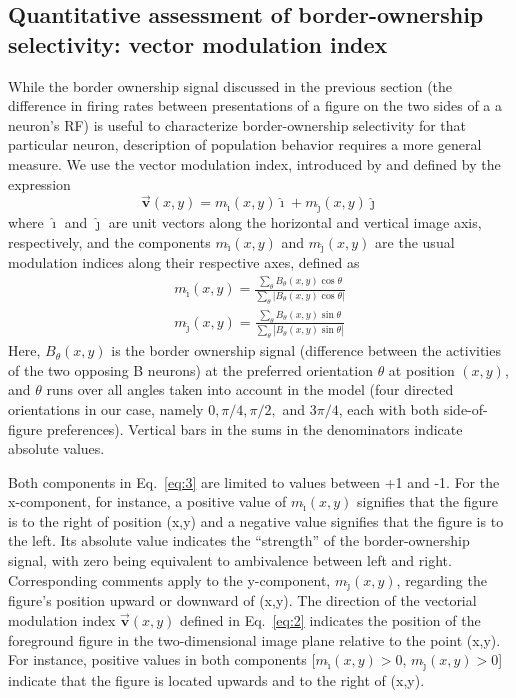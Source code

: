 \subsection{Quantitative assessment of border-ownership selectivity:
  vector modulation index}
\label{sec:vmi}

While the border ownership signal discussed in the previous section (the difference in firing rates between presentations of a figure on the two sides of a a neuron's RF) is useful to characterize border-ownership selectivity for that particular neuron, description of population behavior requires a more general measure. We use the vector modulation index, introduced by \cite{Craft_etal07} and defined
by the expression 
\begin{equation}
\label{eq:2}
\overrightarrow{\mathbf{v}}(x,y) = m_{\hat{\imath}}(x,y)\hat{\imath} + m_{\hat{\jmath}}(x,y)\hat{\jmath}
\end{equation}
where $\hat{\imath}$ and $\hat{\jmath}$ are unit vectors along the horizontal and vertical image axis, respectively, and the components $m_{\hat{\imath}}(x,y)$ and $m_{\hat{\jmath}}(x,y)$ are the usual modulation indices along their respective axes, defined as
\begin{equation}
\label{eq:3}
\begin{split}
	m_{\hat{\imath}}(x,y) = \frac{\sum_{\theta}
        B_{\theta}(x,y)\cos\theta}{\sum_{\theta}
                \left|B_{\theta}(x,y)\cos\theta\right|} \\
	m_{\hat{\jmath}}(x,y) = \frac{\sum_{\theta}
        B_{\theta}(x,y)\sin\theta}{\sum_{\theta}
                \left|B_{\theta}(x,y)\sin\theta\right|}
\end{split}
\end{equation}
Here, $B_{\theta}(x,y)$ is the border ownership signal (difference between the activities of the two opposing B neurons) at the preferred
orientation $\theta$ at position $(x,y)$, and $\theta$ runs over all
angles taken into account in the model (four directed orientations in our case, namely $0, \pi/4, \pi/2,$ and $3\pi/4$, each with both side-of-figure preferences). Vertical bars in the sums in the denominators indicate absolute values.

Both components in Eq.~\ref{eq:3} are limited to values between +1 and
-1. For the x-component, for instance, a positive value of
$m_{\hat{\imath}}(x,y)$ signifies that the figure is to the right of
position (x,y) and a negative value signifies that the figure is to
the left. Its absolute value indicates the ``strength'' of the
border-ownership signal, with zero being equivalent to ambivalence
between left and right. Corresponding comments apply to the y-component, $m_{\hat{\jmath}}(x,y)$, regarding the figure's position
upward or downward of (x,y). The direction of the vectorial modulation
index $\overrightarrow{\mathbf{v}}(x,y)$ defined in Eq.~\ref{eq:2} indicates the position of the foreground figure in the two-dimensional image plane relative to the point (x,y). For instance, positive values in both components [$m_{\hat{\imath}}(x,y) > 0$, $m_{\hat{\jmath}}(x,y) > 0$] indicate that the figure is located upwards and to the right of (x,y).

